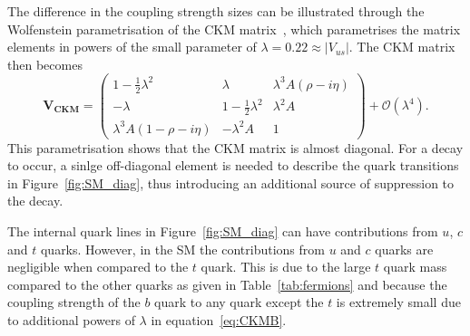 The difference in the coupling strength sizes can be illustrated through the Wolfenstein parametrisation of the CKM matrix~\cite{PhysRevLett.51.1945}, which parametrises the matrix elements in powers of the small parameter of $\lambda = 0.22 \approx |V_{us}|$. The CKM matrix then becomes
\begin{equation}
\mathbf{V_{CKM}} =
 \begin{pmatrix}
 1 - \frac{1}{2}\lambda^2 & \lambda & \lambda^3 A (\rho - i \eta) \\
 - \lambda                & 1 - \frac{1}{2}\lambda^2 & \lambda^2 A \\
 \lambda^3 A (1 - \rho- i \eta) & -\lambda^2 A & 1
 \end{pmatrix} + \mathcal{O}(\lambda^4).
\label{eq:CKMB}
\end{equation}
This parametrisation shows that the CKM matrix is almost diagonal. For a \bmumu decay to occur, a sinlge off-diagonal element is needed to describe the quark transitions in Figure~\ref{fig:SM_diag}, thus introducing an additional source of suppression to the decay. 

The internal quark lines in Figure~\ref{fig:SM_diag} can have contributions from $u$, $c$ and $t$ quarks. However, in the SM the contributions from $u$ and $c$ quarks are negligible when compared to the $t$ quark. This is due to the large $t$ quark mass compared to the other quarks as given in Table~\ref{tab:fermions} and because the coupling strength of the $b$ quark to any quark except the $t$ is extremely small due to additional powers of $\lambda$ in equation~\ref{eq:CKMB}.


